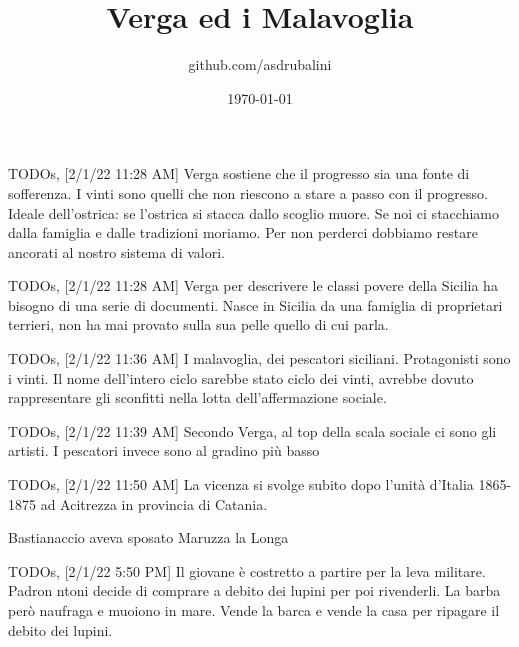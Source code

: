 \documentclass{article}
\title{Verga ed i Malavoglia}
\author{github.com/asdrubalini}
\date{\today}
\begin{document}
    \maketitle

    TODOs, [2/1/22 11:28 AM]
Verga sostiene che il progresso sia una fonte di sofferenza. I vinti sono quelli che non riescono a stare a passo con il progresso.
Ideale dell'ostrica: se l'ostrica si stacca dallo scoglio muore. Se noi ci stacchiamo dalla famiglia e dalle tradizioni moriamo. Per non perderci dobbiamo restare ancorati al nostro sistema di valori.

TODOs, [2/1/22 11:28 AM]
Verga per descrivere le classi povere della Sicilia ha bisogno di una serie di documenti. Nasce in Sicilia da una famiglia di proprietari terrieri, non ha mai provato sulla sua pelle quello di cui parla.

TODOs, [2/1/22 11:36 AM]
I malavoglia, dei pescatori siciliani. Protagonisti sono i vinti. Il nome dell'intero ciclo sarebbe stato ciclo dei vinti, avrebbe dovuto rappresentare gli sconfitti nella lotta dell'affermazione sociale.

TODOs, [2/1/22 11:39 AM]
Secondo Verga, al top della scala sociale ci sono gli artisti. I pescatori invece sono al gradino più basso

TODOs, [2/1/22 11:50 AM]
La vicenza si svolge subito dopo l'unità d'Italia 1865-1875 ad Acitrezza in provincia di Catania. 

Bastianaccio aveva sposato Maruzza la Longa

TODOs, [2/1/22 5:50 PM]
Il giovane è costretto a partire per la leva militare. Padron ntoni decide di comprare a debito dei lupini per poi rivenderli. La barba però naufraga e muoiono in mare. Vende la barca e vende la casa per ripagare il debito dei lupini.
\end{document}
